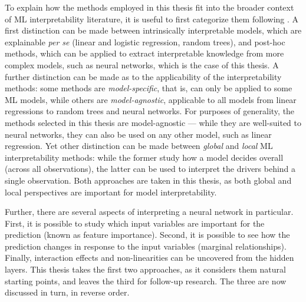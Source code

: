 			To explain how the methods employed in this thesis fit into the broader context of ML interpretability literature, it is useful to first categorize them following \cite{molnar2020interpretable}. A first distinction can be made between intrinsically interpretable models, which are explainable \textit{per se} (linear and logistic regression, random trees), and post-hoc methods, which can be applied to extract interpretable knowledge from more complex models, such as neural networks, which is the case of this thesis. A further distinction can be made as to the applicability of the interpretability methods: some methods are \textit{model-specific}, that is, can only be applied to some ML models, while others are \textit{model-agnostic}, applicable to all models from linear regressions to random trees and neural networks. For purposes of generality, the methods selected in this thesis are model-agnostic --- while they are well-suited to neural networks, they can also be used on any other model, such as linear regression. Yet other distinction can be made between \textit{global} and \textit{local} ML interpretability methods: while the former study how a model decides overall (across all observations), the latter can be used to interpret the drivers behind a single observation. Both approaches are taken in this thesis, as both global and local perspectives are important for model interpretability. 
			
			Further, there are several aspects of interpreting a neural network in particular. First, it is possible to study which input variables are important for the prediction (known as feature importance). Second, it is possible to see how the prediction changes in response to the input variables (marginal relationships). Finally, interaction effects and non-linearities can be uncovered from the hidden layers. This thesis takes the first two approaches, as it considers them natural starting points, and leaves the third for follow-up research. The three are now discussed in turn, in reverse order.  


